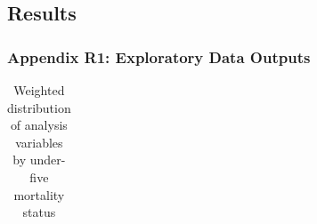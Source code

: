 \documentclass[
  11pt,
  a4paper,
]{article}
\begin{document}
\subsection{Results}\label{results-1}

\subsubsection{Appendix R1: Exploratory Data
Outputs}\label{appendix-r1-exploratory-data-outputs}

\begingroup\fontsize{11}{13}\selectfont

\begin{longtable}[t]{>{\raggedright\arraybackslash}p{4.5cm}>{\raggedleft\arraybackslash}p{3.1cm}>{\raggedleft\arraybackslash}p{3.1cm}>{\raggedleft\arraybackslash}p{3.1cm}}

\caption{\label{tbl-appendix-weighted-baseline}Weighted distribution of
analysis variables by under-five mortality status}

\tabularnewline


\end{longtable}
\end{document}
